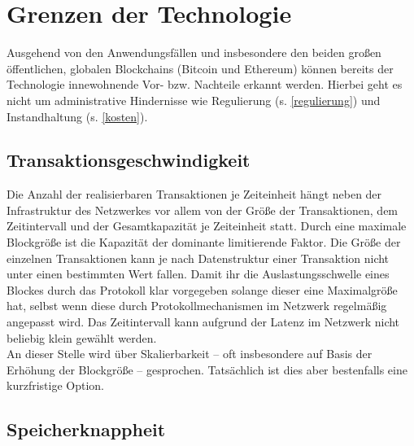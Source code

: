








\section{Grenzen der Technologie}\label{grenzen-der-technologie}
%

Ausgehend von den Anwendungsfällen und insbesondere den beiden großen öffentlichen, globalen Blockchains (Bitcoin und Ethereum)  können
bereits der Technologie innewohnende Vor- bzw. Nachteile erkannt werden.
Hierbei geht es nicht um administrative Hindernisse wie Regulierung\label{first:regulierung} (s. \ref{regulierung}) und Instandhaltung\label{first:kosten} (s. \ref{kosten}).

\subsection{Transaktionsgeschwindigkeit}%

Die Anzahl der realisierbaren Transaktionen je Zeiteinheit hängt neben der Infrastruktur des Netzwerkes vor allem von der Größe der Transaktionen, dem Zeitintervall und der Gesamtkapazität je Zeiteinheit statt. Durch eine maximale Blockgröße ist die Kapazität der dominante limitierende Faktor. Die Größe der einzelnen Transaktionen kann je nach Datenstruktur einer Transaktion nicht unter einen bestimmten Wert fallen. Damit ihr die Auslastungsschwelle eines Blockes durch das Protokoll klar vorgegeben solange dieser eine Maximalgröße hat, selbst wenn diese durch Protokollmechanismen im Netzwerk regelmäßig angepasst wird. Das Zeitintervall kann aufgrund der Latenz im Netzwerk nicht beliebig klein gewählt werden. \\
An dieser Stelle wird über Skalierbarkeit -- oft insbesondere auf Basis der Erhöhung der Blockgröße -- gesprochen. Tatsächlich ist dies aber bestenfalls eine kurzfristige Option. 

\subsection{Speicherknappheit}%

